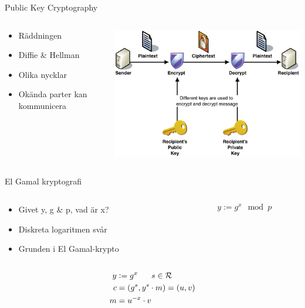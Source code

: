 \begin{frame}{Public Key Cryptography}

\begin{columns}
    \begin{column}{0.45\textwidth}
        \begin{itemize}
			\item Räddningen
			\item Diffie \& Hellman
			\item Olika nycklar
			\item Okända parter kan kommunicera
		\end{itemize}
    \end{column}
	\begin{column}{0.55\textwidth}
    	\includegraphics[width=\textwidth]{images/asymmetric.png}
	\end{column}
\end{columns}

\end{frame}

\begin{frame}{El Gamal kryptografi}

\begin{columns}
	\begin{column}{0.5\textwidth}
		\begin{itemize}
			\item Givet y, g \& p, vad är x?
			\item Diskreta logaritmen svår
			\item Grunden i El Gamal-krypto
		\end{itemize}
	\end{column}
	\begin{column}{0.5\textwidth}
		{\LARGE $$y := g^x \mod{p}$$}
	\end{column}
\end{columns}

\vspace{3pt}

{\LARGE
\begin{align*}
y &\vcentcolon= g^{x} \,\,\,\,\,\,\,\,\,\, s\in \mathcal{R} \\
c &= (g^s, y^s\cdot m) = (u, v) \\
 m &= u^{-x}\cdot v
\end{align*}}

\end{frame}

